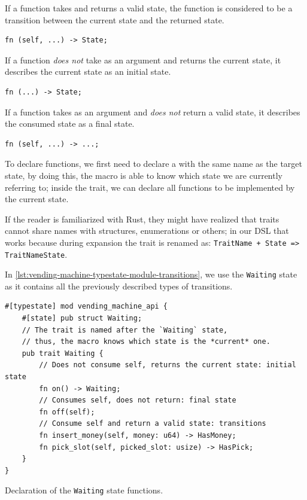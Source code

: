 \begin{compactitem}
    \item If a function takes  and returns a valid state,
    the function is considered to be a transition between the current state and the returned state.
    \begin{verbatim}
fn (self, ...) -> State;
    \end{verbatim}
    \item If a function \emph{does not} take  as an argument and returns the current state,
    it describes the current state as an initial state.
    \begin{verbatim}
fn (...) -> State;
    \end{verbatim}
    \item If a function takes  as an argument and \emph{does not} return a valid state,
    it describes the consumed state as a final state.
    \begin{verbatim}
fn (self, ...) -> ...;
    \end{verbatim}
\end{compactitem}

To declare functions, we first need to declare a  with the same name as the target state,
by doing this, the macro is able to know which state we are currently referring to;
inside the trait, we can declare all functions to be implemented by the current state.

If the reader is familiarized with Rust, they might have realized that traits cannot share names with structures,
enumerations or others; in our DSL that works because during expansion the trait is renamed as: \texttt{TraitName + State => TraitNameState}.

In \autoref{lst:vending-machine-typestate-module-transitions},
we use the \texttt{Waiting} state as it contains all the previously described types of transitions.

\begin{listing}
    \begin{verbatim}
#[typestate] mod vending_machine_api {
    #[state] pub struct Waiting;
    // The trait is named after the `Waiting` state,
    // thus, the macro knows which state is the *current* one.
    pub trait Waiting {
        // Does not consume self, returns the current state: initial state
        fn on() -> Waiting;
        // Consumes self, does not return: final state
        fn off(self);
        // Consume self and return a valid state: transitions
        fn insert_money(self, money: u64) -> HasMoney;
        fn pick_slot(self, picked_slot: usize) -> HasPick;
    }
}
    \end{verbatim}
    \caption{Declaration of the \texttt{Waiting} state functions.}
    \label{lst:vending-machine-typestate-module-transitions}
\end{listing}

